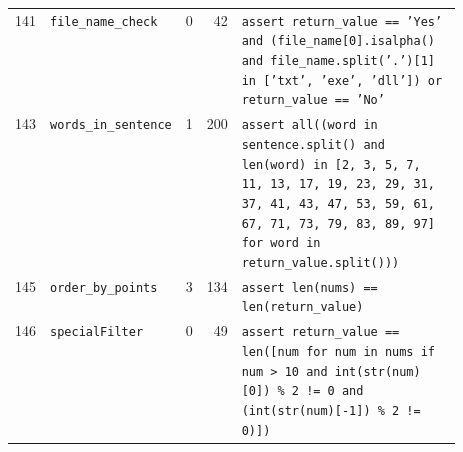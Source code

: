 \begin{footnotesize}
\begin{longtable}{@{}r l r r p{0.52\linewidth}@{}}
141 & \texttt{file\_name\_check} & 0 & 42 & \texttt{assert \allowbreak{}return\_value \allowbreak{}=\allowbreak{}=\allowbreak{} \allowbreak{}'\allowbreak{}Yes'\allowbreak{} \allowbreak{}and \allowbreak{}(\allowbreak{}file\_name[\allowbreak{}0]\allowbreak{}.\allowbreak{}isalpha(\allowbreak{})\allowbreak{} \allowbreak{}and \allowbreak{}file\_name.\allowbreak{}split(\allowbreak{}'\allowbreak{}.\allowbreak{}'\allowbreak{})\allowbreak{}[\allowbreak{}1]\allowbreak{} \allowbreak{}in \allowbreak{}[\allowbreak{}'\allowbreak{}txt'\allowbreak{},\allowbreak{} \allowbreak{}'\allowbreak{}exe'\allowbreak{},\allowbreak{} \allowbreak{}'\allowbreak{}dll'\allowbreak{}]\allowbreak{})\allowbreak{} \allowbreak{}or \allowbreak{}return\_value \allowbreak{}=\allowbreak{}=\allowbreak{} \allowbreak{}'\allowbreak{}No'\allowbreak{}} \\
143 & \texttt{words\_in\_sentence} & 1 & 200 & \texttt{assert \allowbreak{}all(\allowbreak{}(\allowbreak{}word \allowbreak{}in \allowbreak{}sentence.\allowbreak{}split(\allowbreak{})\allowbreak{} \allowbreak{}and \allowbreak{}len(\allowbreak{}word)\allowbreak{} \allowbreak{}in \allowbreak{}[\allowbreak{}2,\allowbreak{} \allowbreak{}3,\allowbreak{} \allowbreak{}5,\allowbreak{} \allowbreak{}7,\allowbreak{} \allowbreak{}11,\allowbreak{} \allowbreak{}13,\allowbreak{} \allowbreak{}17,\allowbreak{} \allowbreak{}19,\allowbreak{} \allowbreak{}23,\allowbreak{} \allowbreak{}29,\allowbreak{} \allowbreak{}31,\allowbreak{} \allowbreak{}37,\allowbreak{} \allowbreak{}41,\allowbreak{} \allowbreak{}43,\allowbreak{} \allowbreak{}47,\allowbreak{} \allowbreak{}53,\allowbreak{} \allowbreak{}59,\allowbreak{} \allowbreak{}61,\allowbreak{} \allowbreak{}67,\allowbreak{} \allowbreak{}71,\allowbreak{} \allowbreak{}73,\allowbreak{} \allowbreak{}79,\allowbreak{} \allowbreak{}83,\allowbreak{} \allowbreak{}89,\allowbreak{} \allowbreak{}97]\allowbreak{} \allowbreak{}for \allowbreak{}word \allowbreak{}in \allowbreak{}return\_value.\allowbreak{}split(\allowbreak{})\allowbreak{})\allowbreak{})\allowbreak{}} \\
145 & \texttt{order\_by\_points} & 3 & 134 & \texttt{assert \allowbreak{}len(\allowbreak{}nums)\allowbreak{} \allowbreak{}=\allowbreak{}=\allowbreak{} \allowbreak{}len(\allowbreak{}return\_value)\allowbreak{}} \\
146 & \texttt{specialFilter} & 0 & 49 & \texttt{assert \allowbreak{}return\_value \allowbreak{}=\allowbreak{}=\allowbreak{} \allowbreak{}len(\allowbreak{}[\allowbreak{}num \allowbreak{}for \allowbreak{}num \allowbreak{}in \allowbreak{}nums \allowbreak{}if \allowbreak{}num \allowbreak{}>\allowbreak{} \allowbreak{}10 \allowbreak{}and \allowbreak{}int(\allowbreak{}str(\allowbreak{}num)\allowbreak{}[\allowbreak{}0]\allowbreak{})\allowbreak{} \allowbreak{}\% \allowbreak{}2 \allowbreak{}!=\allowbreak{} \allowbreak{}0 \allowbreak{}and \allowbreak{}(\allowbreak{}int(\allowbreak{}str(\allowbreak{}num)\allowbreak{}[\allowbreak{}-\allowbreak{}1]\allowbreak{})\allowbreak{} \allowbreak{}\% \allowbreak{}2 \allowbreak{}!=\allowbreak{} \allowbreak{}0)\allowbreak{}]\allowbreak{})\allowbreak{}} \\

\end{longtable}
\end{footnotesize}
